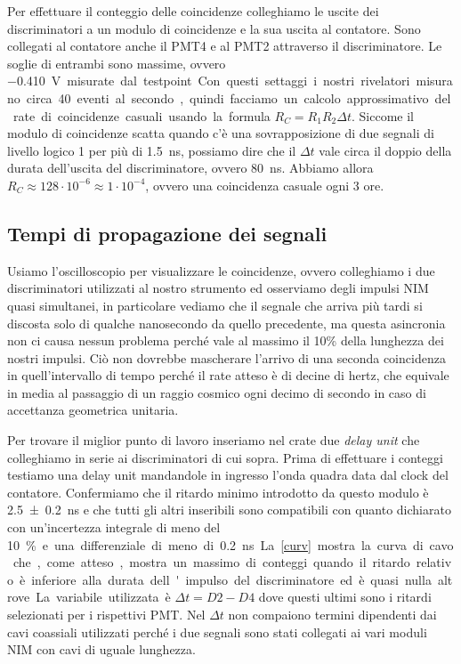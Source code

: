 \documentclass[a4paper]{article}
\begin{document}
Per effettuare il conteggio delle coincidenze colleghiamo le uscite dei discriminatori a un modulo di coincidenze e la sua uscita al  contatore.
 Sono collegati al contatore anche il PMT4 e al PMT2 attraverso il discriminatore.
Le soglie di entrambi sono massime, ovvero \SI{-0.410}V misurate dal testpoint.
Con questi settaggi i nostri rivelatori misurano circa 40 eventi al secondo,
quindi facciamo un calcolo approssimativo del rate di coincidenze casuali usando la formula
$R_C=R_1R_2\Delta t$.
Siccome il modulo di coincidenze scatta quando c'è una sovrapposizione di due segnali di livello logico 1 per più di \SI{1.5}{ns},
possiamo dire che il $\Delta t$ vale circa il doppio della durata dell'uscita del discriminatore, ovvero \SI{80}{ns}.
Abbiamo allora $R_C\approx 128\cdot10^{-6}\approx1\cdot10^{-4}$,
ovvero una coincidenza casuale ogni 3 ore.

\subsection*{Tempi di propagazione dei segnali}

Usiamo l'oscilloscopio per visualizzare le coincidenze, ovvero colleghiamo i due discriminatori utilizzati al nostro strumento ed osserviamo degli impulsi NIM quasi simultanei, in particolare vediamo che il segnale che arriva più tardi si discosta solo di qualche nanosecondo da quello precedente, ma questa asincronia non ci causa nessun problema perché vale al massimo il 10\% della lunghezza dei nostri impulsi.
Ciò non dovrebbe mascherare l'arrivo di una seconda coincidenza in quell'intervallo di tempo perché il rate atteso è di decine di hertz, che equivale in media al passaggio di un raggio cosmico ogni decimo di secondo in caso di accettanza geometrica unitaria.

Per trovare il miglior punto di lavoro inseriamo nel crate due \emph{delay unit} che colleghiamo in serie ai discriminatori di cui sopra. Prima di effettuare i conteggi testiamo una delay unit mandandole in ingresso l'onda quadra data dal clock del contatore. Confermiamo che il ritardo minimo introdotto da questo modulo è \SI{2.5\pm0.2} {ns} e che tutti gli altri inseribili sono compatibili con quanto dichiarato con un'incertezza integrale di meno del \SI{10}\% e una differenziale di meno di \SI{0.2}{ns}. La \autoref{curv} mostra la curva di cavo che, come atteso, mostra un massimo di conteggi quando il ritardo relativo è inferiore alla durata dell'impulso del discriminatore ed è quasi nulla altrove. La variabile utilizzata è $\Delta t=D2-D4$ dove questi ultimi sono i ritardi selezionati per i rispettivi PMT. Nel $\Delta t$ non compaiono termini dipendenti dai cavi coassiali utilizzati perché i due segnali sono stati collegati ai vari moduli NIM con cavi di uguale lunghezza.
\end{document}
